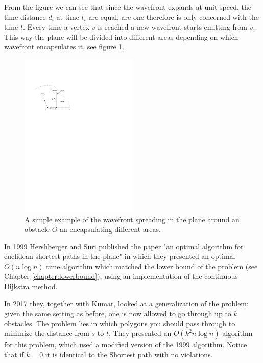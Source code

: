From the figure we can see that since the wavefront expands at unit-speed, the time distance
$d_i$ at time $t_i$ are equal, are one therefore is only concerned with the time $t$.
Every time a vertex $v$ is reached a new wavefront starts emitting from $v$. This way
the plane will be divided into different areas depending on which wavefront encapsulates it,
see figure \ref{fig:introductiontowavefront}.

\begin{figure}[H]
    \centering
	\includegraphics[width=0.5\textwidth]{figures/introductiontowavefront.pdf}
	\caption{A simple example of the wavefront spreading in the plane around an obstacle $O$
	         an encapsulating different areas.}
     \label{fig:introductiontowavefront}
\end{figure}

In 1999 Hershberger and Suri published the paper "an optimal algorithm for euclidean shortest 
paths in the plane"\cite{HershbergerS99} in which they presented an optimal $O(n\log n)$ time 
algorithm which matched the lower bound of the problem (see Chapter \ref{chapter:lowerbound}), 
using an implementation of the continuous Dijkstra method.

In 2017 they, together with Kumar, looked at a generalization of the problem:
given the same setting as before, one is now allowed to go through up to $k$ obstacles.
The problem lies in which polygons you should pass through to minimize the distance from
$s$ to $t$. They presented an $O(k^2 n\log n)$ algorithm for this problem,
which used a modified version of the 1999 algorithm\cite{HershbergerKS17}.
Notice that if $k=0$ it is identical to the Shortest path with no violations.

